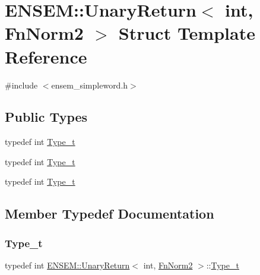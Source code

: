 \hypertarget{structENSEM_1_1UnaryReturn_3_01int_00_01FnNorm2_01_4}{}\section{E\+N\+S\+EM\+:\+:Unary\+Return$<$ int, Fn\+Norm2 $>$ Struct Template Reference}
\label{structENSEM_1_1UnaryReturn_3_01int_00_01FnNorm2_01_4}


{\ttfamily \#include $<$ensem\+\_\+simpleword.\+h$>$}

\subsection*{Public Types}
\begin{DoxyCompactItemize}
\item 
typedef int \mbox{\hyperlink{structENSEM_1_1UnaryReturn_3_01int_00_01FnNorm2_01_4_ae4204ae93a1e761995e0aaab5504ea66}{Type\+\_\+t}}
\item 
typedef int \mbox{\hyperlink{structENSEM_1_1UnaryReturn_3_01int_00_01FnNorm2_01_4_ae4204ae93a1e761995e0aaab5504ea66}{Type\+\_\+t}}
\item 
typedef int \mbox{\hyperlink{structENSEM_1_1UnaryReturn_3_01int_00_01FnNorm2_01_4_ae4204ae93a1e761995e0aaab5504ea66}{Type\+\_\+t}}
\end{DoxyCompactItemize}


\subsection{Member Typedef Documentation}
\mbox{\label{structENSEM_1_1UnaryReturn_3_01int_00_01FnNorm2_01_4_ae4204ae93a1e761995e0aaab5504ea66}} 
\subsubsection{\texorpdfstring{Type\_t}{Type\_t}\hspace{0.1cm}{\footnotesize\ttfamily [1/3]}}
{\footnotesize\ttfamily typedef int \mbox{\hyperlink{structENSEM_1_1UnaryReturn}{E\+N\+S\+E\+M\+::\+Unary\+Return}}$<$ int, \mbox{\hyperlink{structENSEM_1_1FnNorm2}{Fn\+Norm2}} $>$\+::\mbox{\hyperlink{structENSEM_1_1UnaryReturn_3_01int_00_01FnNorm2_01_4_ae4204ae93a1e761995e0aaab5504ea66}{Type\+\_\+t}}}

